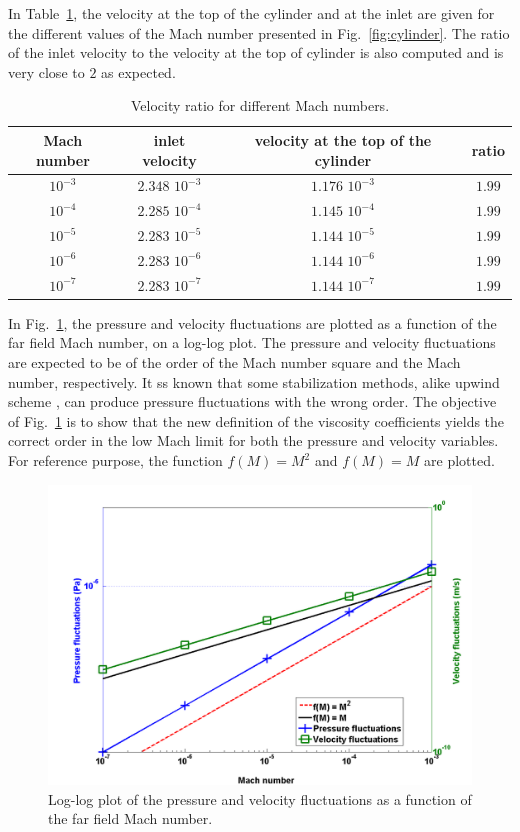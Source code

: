 \documentclass[preprint,10pt]{elsarticle}
\newcommand{\fig}[1]{Fig.~\ref{#1}}                      %
\newcommand{\tbl}[1]{Table~\ref{#1}}                     %
\begin{document}
In \tbl{tbl:velocity_ratio}, the velocity at the top of the cylinder and at the inlet are given for the different values of the Mach number presented in \fig{fig:cylinder}. The ratio of the inlet velocity to the velocity at the top of cylinder is also computed and is very close to $2$ as expected.
\begin{table}[H]
\begin{center}
 \caption{\label{tbl:velocity_ratio}Velocity ratio for different Mach numbers.}
\begin{tabular}{|c|c|c|c|}
\hline
Mach number & inlet velocity & velocity at the top of the cylinder & ratio \\ \hline
$10^{-3}$ & $2.348$ $10^{-3}$ & $1.176$ $10^{-3}$& $1.99$ \\ \hline
$10^{-4}$ & $2.285$ $10^{-4}$ & $1.145$ $10^{-4}$& $1.99$ \\ \hline
$10^{-5}$ & $2.283$ $10^{-5}$ & $1.144$ $10^{-5}$ & $1.99$ \\ \hline
$10^{-6}$ & $2.283$ $10^{-6}$ & $1.144$ $10^{-6}$ & $1.99$ \\ \hline
$10^{-7}$ & $2.283$ $10^{-7}$ & $1.144$ $10^{-7}$ & $1.99$ \\ \hline
\end{tabular}
\end{center}
\nonumber
\end{table}
In \fig{fig:pressure_vel_fluc}, the pressure and velocity fluctuations are plotted as a function of the far field Mach number, on a log-log plot. The pressure and velocity fluctuations are expected to be of the order of the Mach number square and the Mach number, respectively. It ss known that some stabilization methods, alike upwind scheme \cite{guillard}, can produce pressure fluctuations with the wrong order. The objective of \fig{fig:pressure_vel_fluc} is to show that the new definition of the viscosity coefficients yields the correct order in the low Mach limit for both the pressure and velocity variables. For reference purpose, the function $f(M) = M^2$ and $f(M)=M$ are plotted.  
\begin{figure}[H]
\centering
\includegraphics[width=\textwidth]{pressure_fluctuation.png}
\caption{Log-log plot of the pressure and velocity fluctuations as a function of the far field Mach number.}
\label{fig:pressure_vel_fluc}
\end{figure}
\end{document}
